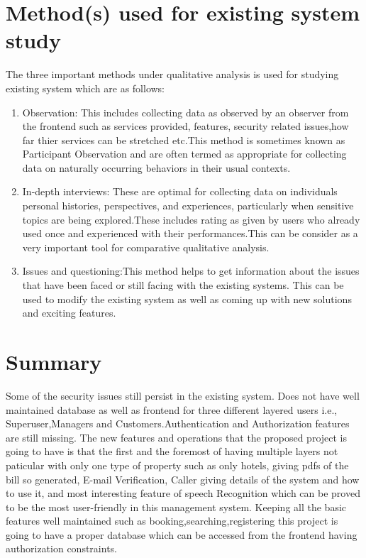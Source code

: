 \documentclass[12pt]{report}
\begin{document}
\section{Method(s) used for existing system study}
The three important methods under qualitative
analysis is used for studying existing system
which are as follows:
\begin{enumerate}
\item Observation: This includes collecting data as
observed by an observer from the frontend such
as services provided, features, security related
issues,how far thier services can be stretched
etc.This method is sometimes known as
Participant Observation and are often termed as
appropriate for collecting data on naturally
occurring behaviors in their usual contexts.
\item In-depth interviews: These are optimal for
collecting data on individuals personal histories,
perspectives, and experiences, particularly when
sensitive topics are being explored.These
includes rating as given by users who already
used once and experienced with their
performances.This can be consider as a very
important tool for comparative qualitative
analysis.
\item Issues and questioning:This method helps to
get information about the issues that have been
faced or still facing with the existing systems.
This can be used to modify the existing system
as well as coming up with new solutions and
exciting features.
\end{enumerate}

\section{Summary}
Some of the security issues still persist in the
existing system. Does not have well maintained
database as well as frontend for three different
layered users i.e., Superuser,Managers and
Customers.Authentication and Authorization
features are still missing.
The new features and operations that the
proposed project is going to have is that the first and the foremost of having multiple layers not
paticular with only one type of property such as
only hotels, giving pdfs of the bill so generated,
E-mail Verification, Caller giving details of the
system and how to use it, and most interesting
feature of speech Recognition which can be
proved to be the most user-friendly in this
management system.
Keeping all the basic
features
well
maintained
such
as
booking,searching,registering this project is
going to have a proper database which can be
accessed from the frontend having authorization
constraints.
\end{document}
